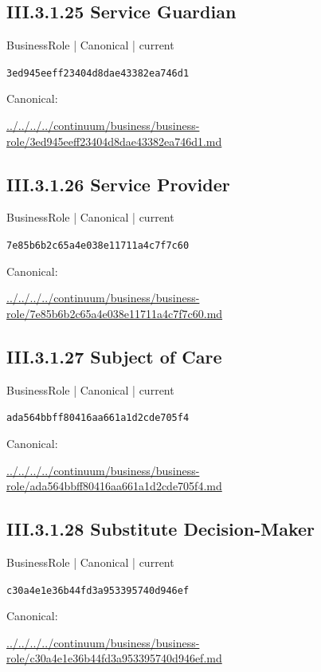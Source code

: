 \documentclass[10pt,a4paper]{article}
\begin{document}
\subsection*{III.3.1.25 Service Guardian}
\label{element-3ed945eeff23404d8dae43382ea746d1}
{\small BusinessRole | Canonical | current}\par
\texttt{3ed945eeff23404d8dae43382ea746d1}\par
Canonical: \par
{\footnotesize\url{../../../../continuum/business/business-role/3ed945eeff23404d8dae43382ea746d1.md}}\par
\subsection*{III.3.1.26 Service Provider}
\label{element-7e85b6b2c65a4e038e11711a4c7f7c60}
{\small BusinessRole | Canonical | current}\par
\texttt{7e85b6b2c65a4e038e11711a4c7f7c60}\par
Canonical: \par
{\footnotesize\url{../../../../continuum/business/business-role/7e85b6b2c65a4e038e11711a4c7f7c60.md}}\par
\subsection*{III.3.1.27 Subject of Care}
\label{element-ada564bbff80416aa661a1d2cde705f4}
{\small BusinessRole | Canonical | current}\par
\texttt{ada564bbff80416aa661a1d2cde705f4}\par
Canonical: \par
{\footnotesize\url{../../../../continuum/business/business-role/ada564bbff80416aa661a1d2cde705f4.md}}\par
\subsection*{III.3.1.28 Substitute Decision-Maker}
\label{element-c30a4e1e36b44fd3a953395740d946ef}
{\small BusinessRole | Canonical | current}\par
\texttt{c30a4e1e36b44fd3a953395740d946ef}\par
Canonical: \par
{\footnotesize\url{../../../../continuum/business/business-role/c30a4e1e36b44fd3a953395740d946ef.md}}\par
\end{document}
